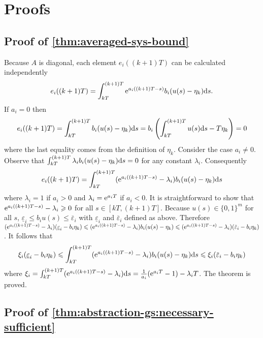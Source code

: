 \section{Proofs}

\subsection{Proof of \protect\cref{thm:averaged-sys-bound}}
\label{sec:proof:averaged-sys-bound}

  Because $A$ is diagonal, each element $e_i ((k + 1) T)$ can be calculated
  independently
  \[ e_i ((k + 1) T) = \int_{kT}^{(k + 1) T} \mathrm{e}^{a_i ((k + 1) T - s)} b_i 
     (u (s) - \eta_k) \mathrm{d} s \text{.} \]
  If $a_i = 0$ then
  \[ e_i ((k + 1) T) = \int_{kT}^{(k + 1) T} b_i  (u (s) - \eta_k) \mathrm{d} s =
     b_i  \left( \int_{kT}^{(k + 1) T} u (s) \mathrm{d} s - T \eta_k \right) = 0
  \]
  where the last equality comes from the definition of $\eta_k$. Consider the
  case $a_i \neq 0$. Observe that $\int_{kT}^{(k + 1) T} \lambda_i b_i  (u (s)
  - \eta_k) \mathrm{d} s = 0$ for any constant $\lambda_i$. Consequently
  \[ e_i ((k + 1) T) = \int_{kT}^{(k + 1) T} (\mathrm{e}^{a_i ((k + 1) T - s)} -
     \lambda_i ) b_i  (u (s) - \eta_k) \mathrm{d} s \]
  where $\lambda_i = 1$ if $a_i > 0$ and $\lambda_i = \mathrm{e}^{a_i T}$ if $a_i
  < 0$. It is straightforward to show that $\mathrm{e}^{a_i ((k + 1) T - s)} -
  \lambda_i \geqslant 0$ for all $s \in [kT, (k + 1) T]$. Because $u (s) \in
  \{ 0, 1 \}^m$ for all $s$, $\underline{\varepsilon}_i \leqslant b_i u (s)
  \leqslant \overbar{\varepsilon}_i$ with $\underline{\varepsilon}_i$ and
  $\overbar{\varepsilon}_i$ defined as above. Therefore $(\mathe^{a_i ((k +
  1) T - s)} - \lambda_i )  (\underline{\varepsilon}_i - b_i \eta_k) \leqslant
  (\mathe^{a_i ((k + 1) T - s)} - \lambda_i ) b_i  (u (s) - \eta_k) \leqslant
  (\mathe^{a_i ((k + 1) T - s)} - \lambda_i )  (\overbar{\varepsilon}_i - b_i
  \eta_k)$. It follows that
  \[ \xi_i  (\underline{\varepsilon}_i - b_i \eta_k) \leqslant \int_{kT}^{(k +
     1) T} (\mathe^{a_i ((k + 1) T - s)} - \lambda_i ) b_i  (u (s) - \eta_k)
     \mathd s \leqslant \xi_i  (\overbar{\varepsilon}_i - b_i \eta_k) \]
  where $\xi_i = \int_{kT}^{(k + 1) T} (\mathrm{e}^{a_i ((k + 1) T - s)} -
  \lambda_i ) \mathrm{d} s = \frac{1}{a_i} (\mathrm{e}^{a_i T} - 1) - \lambda_i T$.
  The theorem is proved.

\subsection{Proof of \protect\cref{thm:abstraction-gs:necessary-sufficient}}
\label{sec:proof:abstraction-gs:necessary-sufficient}




